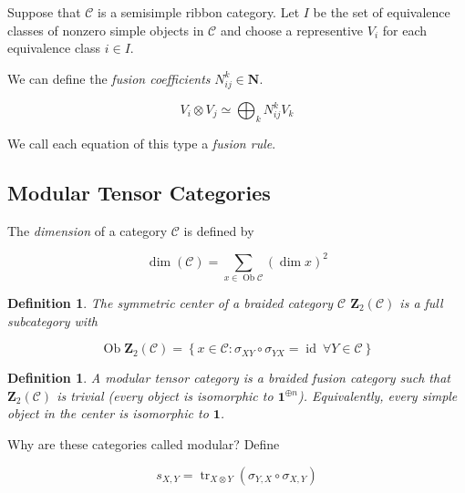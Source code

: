 \documentclass[]{article}
\newtheorem{defn}[theorem]{Definition}
\newcommand{\tr}{\operatorname{tr}}
\newcommand{\id}{\operatorname{id}}
\newcommand{\Ob}{\operatorname{Ob}}
\numberwithin{equation}{subsection}
\begin{document}
    Suppose that $\mathcal{C}$ is a semisimple ribbon category. Let $I$ be the
    set of equivalence classes of nonzero simple objects in $\mathcal{C}$ and
    choose a representive $V_i$ for each equivalence class  $i \in I$.
    
    We can define the \emph{fusion coefficients} $N_{ij}^k \in \mathbf{N}$.

    \begin{equation}
        V_i \otimes V_j \simeq \bigoplus_k N_{ij}^k V_k
    \end{equation}

    We call each equation of this type a \emph{fusion rule}. 

    \subsection{Modular Tensor Categories}

The \emph{dimension} of a category $\mathcal{C}$ is defined by 

\begin{equation}
    \operatorname{dim}(\mathcal{C}) = \sum_{ x \in \Ob \mathcal{C}} (\operatorname{dim} x)^2
\end{equation}


\begin{defn}
    The \emph{symmetric center} of a braided category $\mathcal{C}$ $\mathbf{Z}_2(\mathcal{C})$ is a full subcategory with 

    \begin{equation}
        \Ob \mathbf{Z}_2(\mathcal{C}) = \left\{ x \in \mathcal{C} : \sigma_{XY} \circ \sigma_{YX} = \id\ \forall Y \in \mathcal{C} \right\}
    \end{equation}
\end{defn}

\begin{defn}
    A modular tensor category is a braided fusion category such that $\mathbf{Z}_2(\mathcal{C})$ is trivial (every object is isomorphic to $\mathbf{1}^{\oplus n}$). Equivalently, every simple object in the center is isomorphic to $\mathbf{1}$.
\end{defn}

Why are these categories called modular? 
Define 

\begin{equation}
    s_{X,Y} = \tr_{X \otimes Y}(\sigma_{Y,X} \circ \sigma_{X,Y})
\end{equation}
\end{document}
